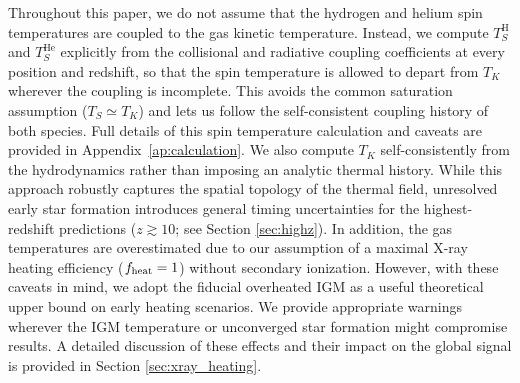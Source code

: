 \documentclass[apj,twocolumn, appendixfloats, twocolappendix, numberedappendix, tighten]{openjournal}
\begin{document}
Throughout this paper, we do not assume that the hydrogen and helium spin temperatures are coupled to the gas kinetic temperature. Instead, we compute $T_S^\mathrm{H}$ and $T_S^\mathrm{He}$ explicitly from the collisional and radiative coupling coefficients at every position and redshift, so that the spin temperature is allowed to depart from $T_K$ wherever the coupling is incomplete. This avoids the common saturation assumption ($T_S \simeq T_K$) and lets us follow the self-consistent coupling history of both species. Full details of this spin temperature calculation and caveats are provided in Appendix~\ref{ap:calculation}. We also compute $T_K$ self-consistently from the hydrodynamics rather than imposing an analytic thermal history. While this approach robustly captures the spatial topology of the thermal field, unresolved early star formation introduces general timing uncertainties for the highest-redshift predictions ($z \gtrsim 10$; see Section \ref{sec:highz}). In addition, the gas temperatures are overestimated due to our assumption of a maximal X-ray heating efficiency ($f_{\rm heat} = 1$) without secondary ionization. However, with these caveats in mind, we adopt the fiducial overheated IGM as a useful theoretical upper bound on early heating scenarios. We provide appropriate warnings wherever the IGM temperature or unconverged star formation might compromise results. A detailed discussion of these effects and their impact on the global signal is provided in Section \ref{sec:xray_heating}.






\end{document}
